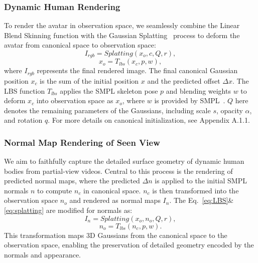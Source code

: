 \subsubsection{Dynamic Human Rendering} 
\label{LBS&rendering}
To render the avatar in observation space, we seamlessly combine the Linear Blend Skinning function with the Gaussian Splatting~\cite{kerbl3Dgaussians} process to deform the avatar from canonical space to observation space:
\begin{equation}
  I_{rgb}=Splatting(x_o,c,Q,r),
  \label{eq:splatting}
\end{equation}
\begin{equation}
  x_o = T_{lbs}(x_c,p,w),
  \label{eq:LBS}
\end{equation}
where $I_{rgb}$ represents the final rendered image. The final canonical Gaussian position $x_c$ is the sum of the initial position $x$ and the predicted offset $\Delta x$. The LBS function $T_{lbs}$ applies the SMPL skeleton pose $p$ and blending weights $w$ to deform $x_c$ into observation space as $x_o$, where $w$ is provided by SMPL~\cite{SMPL:2015}. $Q$ here denotes the remaining parameters of the Gaussians, including scale $s$, opacity $\alpha$, and rotation $q$. For more details on canonical initialization, see Appendix A.1.1.


\subsubsection{Normal Map Rendering of Seen View} 
\label{frontNormalRendering}

We aim to faithfully capture the detailed surface geometry of dynamic human bodies from partial-view videos. Central to this process is the rendering of predicted normal maps, where the predicted \(\Delta n\) is applied to the initial SMPL normals \( n \) to compute \( n_c \) in canonical space. \( n_c \) is then transformed into the observation space \( n_o \) and rendered as normal maps \(I_n\). The Eq.~\eqref{eq:LBS}\&\eqref{eq:splatting} are modified for normals as:
\begin{equation}
  I_{n}=Splatting(x_o,n_o,Q,r),
  \label{eq:normalsplatting}
\end{equation}
\begin{equation}
  n_o = T_{lbs}(n_c,p,w).
  \label{eq:normalLBS}
\end{equation}
This transformation maps 3D Gaussians from the canonical space to the observation space, enabling the preservation of detailed geometry encoded by the normals and appearance.


